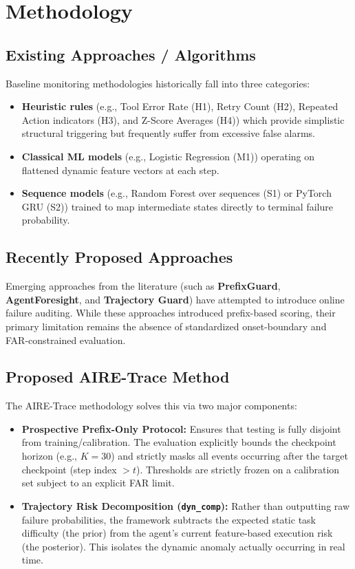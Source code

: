 \documentclass[12pt,a4paper]{article}
\begin{document}
\newpage


\newpage

\section{Methodology}

\subsection{Existing Approaches / Algorithms}
Baseline monitoring methodologies historically fall into three categories:
\begin{itemize}
    \item \textbf{Heuristic rules} (e.g., Tool Error Rate (H1), Retry Count (H2), Repeated Action indicators (H3), and Z-Score Averages (H4)) which provide simplistic structural triggering but frequently suffer from excessive false alarms.
    \item \textbf{Classical ML models} (e.g., Logistic Regression (M1)) operating on flattened dynamic feature vectors at each step.
    \item \textbf{Sequence models} (e.g., Random Forest over sequences (S1) or PyTorch GRU (S2)) trained to map intermediate states directly to terminal failure probability.
\end{itemize}

\subsection{Recently Proposed Approaches}
Emerging approaches from the literature (such as \textbf{PrefixGuard}, \textbf{AgentForesight}, and \textbf{Trajectory Guard}) have attempted to introduce online failure auditing. While these approaches introduced prefix-based scoring, their primary limitation remains the absence of standardized onset-boundary and FAR-constrained evaluation.

\subsection{Proposed AIRE-Trace Method}
The AIRE-Trace methodology solves this via two major components:
\begin{itemize}
    \item \textbf{Prospective Prefix-Only Protocol:} Ensures that testing is fully disjoint from training/calibration. The evaluation explicitly bounds the checkpoint horizon (e.g., $K=30$) and strictly masks all events occurring after the target checkpoint (step index $> t$). Thresholds are strictly frozen on a calibration set subject to an explicit FAR limit.
    \item \textbf{Trajectory Risk Decomposition (\texttt{dyn\_comp}):} Rather than outputting raw failure probabilities, the framework subtracts the expected static task difficulty (the prior) from the agent's current feature-based execution risk (the posterior). This isolates the dynamic anomaly actually occurring in real time.
\end{itemize}
\end{document}
